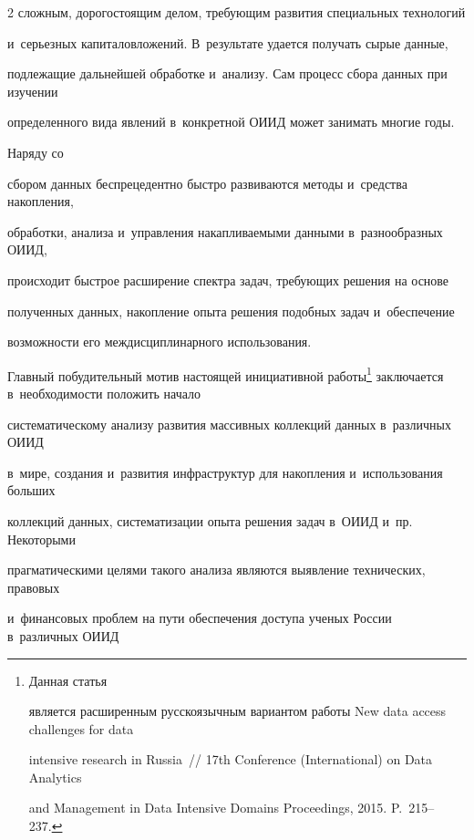 \begin{multicols}{2}
сложным, дорогостоящим делом, требующим развития специальных технологий 


и~серьезных капиталовложений. В~результате удается получать сырые данные, 


подлежащие дальнейшей обработке и~анализу. Сам процесс сбора данных при изучении 


определенного вида явлений в~конкретной ОИИД может занимать многие годы. 





Наряду со 


сбором данных беспрецедентно быстро развиваются методы и~средства накопления, 


обработки, анализа и~управ\-ле\-ния накапливаемыми данными в~разнообразных ОИИД, 


происходит быстрое расширение спектра задач, требующих решения на основе 


полученных данных, накопление опыта решения подобных задач и~обеспечение 


возможности его междисциплинарного использования. 


  


  Главный побудительный мотив настоящей инициативной работы\footnote{Данная статья 


является расширенным русскоязычным вариантом работы  New data access challenges for data 


intensive research in Russia~// 17th Conference (International) on Data Analytics 


and Management in Data Intensive Domains Proceedings, 2015. P.~215--237.} заключается в~необходимости положить начало 


систематическому анализу развития массивных коллекций данных в~различных ОИИД 


в~мире, создания и~развития инфраструктур для накопления и~использования больших 


коллекций данных, систематизации опыта решения задач в~ОИИД и~пр. Некоторыми 


прагматическими целями такого анализа являются выявление технических, правовых 


и~финансовых проблем на пути обеспечения доступа ученых России в~различных ОИИД 



\end{multicols}
